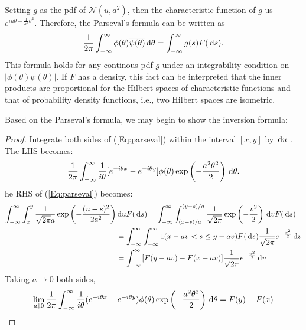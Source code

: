 \begin{remark}
Setting $g$ as the pdf of $\mathcal{N}(u,a^2)$, then the characteristic function of $g$ us $e^{iu\theta - \frac{1}{a^2}\theta^2}$. Therefore, the Parseval's formula can be written as
\[
\frac{1}{2\pi}\int_{-\infty}^\infty \phi(\theta)\overline{\psi(\theta)}\,\mathrm{d}\theta
=
\int_{-\infty}^\infty g(s)F(\,\mathrm{d} s).
\]
This formula holds for any continous pdf $g$ under an integrability condition on $|\phi(\theta)\psi(\theta)|$.
If $F$ has a density, this fact can be interpreted that the inner products are proportional for the Hilbert spaces of characteristic functions and that of probability density functions, i.e., two Hilbert spaces are isometric.
\end{remark}

Based on the Parseval's formula, we may begin to show the inversion formula:
\begin{proof}
Integrate both sides of (\ref{Eq:parseval}) within the interval $[x,y]$ by $\,\mathrm{d} u$ .
The LHS becomes:
\[
\frac{1}{2\pi}\int_{-\infty}^\infty \frac{1}{i\theta}[e^{-i\theta x} - e^{-i\theta y}]\phi(\theta)\exp\left(-\frac{a^2\theta^2}{2}\right)\,\mathrm{d}\theta.
\]
he RHS of (\ref{Eq:parseval}) becomes:
\begin{align*}
\int_{-\infty}^\infty\int_x^y\frac{1}{\sqrt{2\pi}a}\exp\left(-\frac{(u-s)^2}{2a^2}\right)&\,\mathrm{d} uF(\,\mathrm{d} s)
=
\int_{-\infty}^\infty\int_{(x-s)/a}^{(y-s)/a}\frac{1}{\sqrt{2\pi}}\exp\left(-\frac{v^2}{2}\right)\,\mathrm{d} vF(\,\mathrm{d} s)\\
&=
\int_{-\infty}^\infty\int_{-\infty}^\infty 1(x-av<s\le y-av)F(\,\mathrm{d} s)\frac{1}{\sqrt{2\pi}}e^{-\frac{v^2}{2}}\,\mathrm{d} v\\
&=
\int_{-\infty}^\infty[F(y-av) - F(x-av)]\frac{1}{\sqrt{2\pi}}e^{-\frac{v^2}{2}}\,\mathrm{d} v
\end{align*}
Taking $a\to0$ both sides,
\[
\lim_{a\downarrow0}\frac{1}{2\pi}\int_{-\infty}^\infty\frac{1}{i\theta}(e^{-i\theta x} - e^{-i\theta y})
\phi(\theta)\exp\left(-\frac{a^2\theta^2}{2}\right)\,\mathrm{d}\theta
=F(y)-F(x)
\]

\end{proof}






















